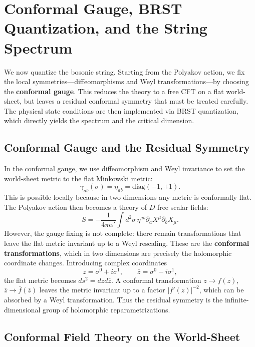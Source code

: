 \documentclass[11pt]{article}
\renewcommand{\bar}{\overline}
\begin{document}
\section{Conformal Gauge, BRST Quantization, and the String Spectrum}

We now quantize the bosonic string. Starting from the Polyakov action, we fix the local symmetries—diffeomorphisms and Weyl transformations—by choosing the \textbf{conformal gauge}. This reduces the theory to a free CFT on a flat world-sheet, but leaves a residual conformal symmetry that must be treated carefully. The physical state conditions are then implemented via BRST quantization, which directly yields the spectrum and the critical dimension.

\subsection{Conformal Gauge and the Residual Symmetry}

In the conformal gauge, we use diffeomorphism and Weyl invariance to set the world-sheet metric to the flat Minkowski metric:
\begin{equation}
\gamma_{ab}(\sigma) = \eta_{ab} = \mathrm{diag}(-1, +1).
\end{equation}
This is possible locally because in two dimensions any metric is conformally flat. The Polyakov action then becomes a theory of $D$ free scalar fields:
\begin{equation}
S = -\frac{1}{4\pi\alpha'} \int d^2\sigma \, \eta^{ab} \partial_a X^\mu \partial_b X_\mu.
\end{equation}
However, the gauge fixing is not complete: there remain transformations that leave the flat metric invariant up to a Weyl rescaling. These are the \textbf{conformal transformations}, which in two dimensions are precisely the holomorphic coordinate changes. Introducing complex coordinates
\begin{equation}
z = \sigma^0 + i\sigma^1, \qquad \bar{z} = \sigma^0 - i\sigma^1,
\end{equation}
the flat metric becomes $ds^2 = dz d\bar{z}$. A conformal transformation $z \to f(z)$, $\bar{z} \to \bar{f}(\bar{z})$ leaves the metric invariant up to a factor $|f'(z)|^{-2}$, which can be absorbed by a Weyl transformation. Thus the residual symmetry is the infinite-dimensional group of holomorphic reparametrizations.

\subsection{Conformal Field Theory on the World-Sheet}
\end{document}
